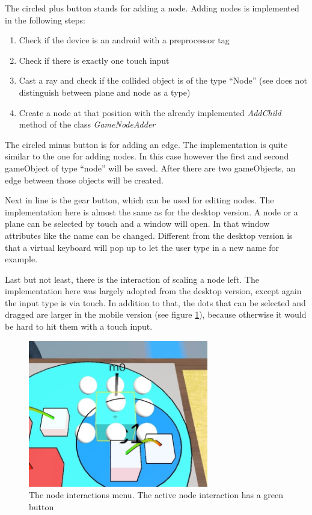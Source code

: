 The circled plus button stands for adding a \gls{node}.
Adding \glspl{node} is implemented in the following steps:
\begin{enumerate}
    \item Check if the device is an \gls{android} with a preprocessor tag
    \item Check if there is exactly one touch input
    \item Cast a ray and check if the collided object is of the type \enquote{Node} (\gls{see} does not distinguish between \gls{plane} and \gls{node} as a type)
    \item Create a \gls{node} at that position with the already implemented \textit{AddChild} method of the class \textit{GameNodeAdder}
\end{enumerate}

The circled minus button is for adding an \gls{edge}.
The implementation is quite similar to the one for adding \glspl{node}.
In this case however the first and second \gls{gameObject} of type \enquote{\gls{node}} will be saved.
After there are two \glspl{gameObject}, an \gls{edge} between those objects will be created.

Next in line is the gear button, which can be used for editing \glspl{node}.
The implementation here is almost the same as for the desktop version.
A \gls{node} or a \gls{plane} can be selected by touch and a window will open.
In that window attributes like the name can be changed.
Different from the desktop version is that a virtual keyboard will pop up to let the user type in a new name for example.

Last but not least, there is the interaction of scaling a \gls{node} left.
The implementation here was largely adopted from the desktop version, except again the input type is via touch.
In addition to that, the dots that can be selected and dragged are larger in the mobile version (see figure \ref{fig:scale}), because otherwise it would be hard to hit them with a touch input.

\begin{figure}[htb]
    \centering
    \includegraphics[width=0.7\textwidth]{Implementation/img/scale.jpeg}
    \caption{The \gls{node} interactions menu. The active \gls{node} interaction has a green button}\label{fig:scale}
\end{figure}

